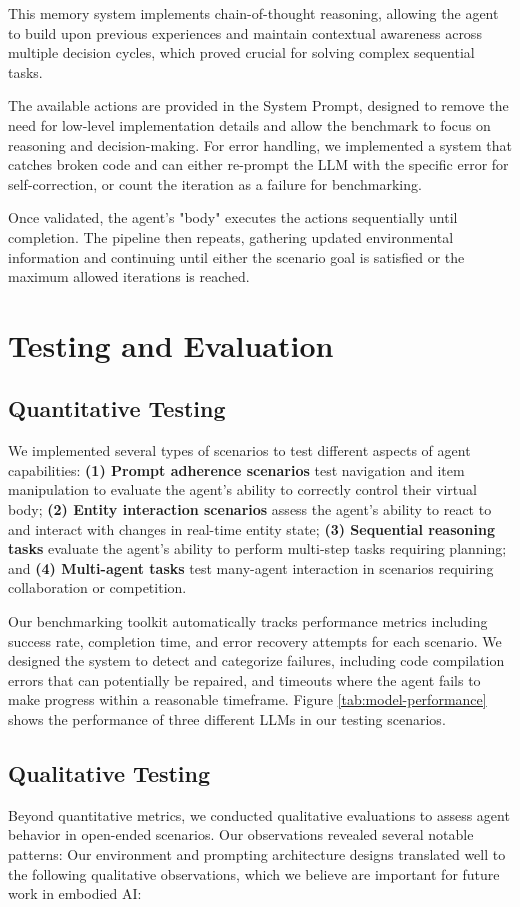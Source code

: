 \documentclass{article}
\begin{document}
This memory system implements chain-of-thought reasoning, allowing the agent to build upon previous experiences and maintain contextual awareness across multiple decision cycles, which proved crucial for solving complex sequential tasks.

The available actions are provided in the System Prompt, designed to remove the need for low-level implementation details and allow the benchmark to focus on reasoning and decision-making.
For error handling, we implemented a system that catches broken code and can either re-prompt the LLM with the specific error for self-correction, or count the iteration as a failure for benchmarking.

Once validated, the agent's "body" executes the actions sequentially until completion.
The pipeline then repeats, gathering updated environmental information and continuing until either the scenario goal is satisfied or the maximum allowed iterations is reached.

\section{Testing and Evaluation}
\subsection{Quantitative Testing}
We implemented several types of scenarios to test different aspects of agent capabilities:
\textbf{(1) Prompt adherence scenarios} test navigation and item manipulation to evaluate the agent's ability to correctly control their virtual body;
\textbf{(2) Entity interaction scenarios} assess the agent's ability to react to and interact with changes in real-time entity state;
\textbf{(3) Sequential reasoning tasks} evaluate the agent's ability to perform multi-step tasks requiring planning; and
\textbf{(4) Multi-agent tasks} test many-agent interaction in scenarios requiring collaboration or competition.

Our benchmarking toolkit automatically tracks performance metrics including success rate, completion time, and error recovery attempts for each scenario. 
We designed the system to detect and categorize failures, including code compilation errors that can potentially be repaired, and timeouts where the agent fails to make progress within a reasonable timeframe.
Figure \ref{tab:model-performance} shows the performance of three different LLMs in our testing scenarios.

\subsection{Qualitative Testing}
Beyond quantitative metrics, we conducted qualitative evaluations to assess agent behavior in open-ended scenarios. Our observations revealed several notable patterns:
Our environment and prompting architecture designs translated well to the following qualitative observations, which we believe are important for future work in embodied AI:
\end{document}
